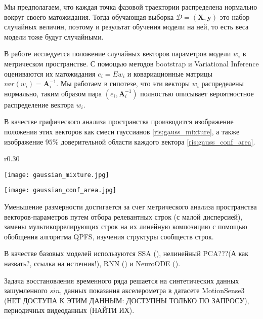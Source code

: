 \documentclass{article}
\begin{document}
Мы предполагаем, что каждая точка фазовой траектории распределена нормально вокруг своего матожидания. Тогда обучающая выборка $\mathcal{D}=(\boldsymbol{X}, \boldsymbol{y})$ это набор случайных величин, поэтому и результат обучения модели на ней, то есть веса модели тоже будут случайными. 

В работе исследуется положение случайных векторов параметров модели $w_i$ в метрическом пространстве. С помощью методов bootstrap и Variational Inference \citep{hastie2009elements} оцениваются их матожидания $e_i=Ew_i$ и ковариационные матрицы $var(w_i) = \boldsymbol{A}^{-1}_i$. Мы работаем в гипотезе, что эти векторы $w_i$ распределены нормально, таким образом пара $(e_i, \boldsymbol{A}^{-1}_i)$ полностью описывает вероятностное распределение вектора $w_i$. 

В качестве графического анализа пространства производится изображение положения этих векторов как смеси гауссианов \ref{ris:gauss_mixture}, а также изображение $95\%$ доверительной области каждого вектора \ref{ris:gauss_conf_area}.

\begin{wrapfigure}{r}{0.30\textwidth}

\texttt{[image: gaussian\_mixture.jpg]}
\caption{Пример смеси гауссианов для 2-х мерных векторов.}
\label{ris:gauss_mixture}

\texttt{[image: gaussian\_conf\_area.jpg]}
\caption{Пример доверительных областей для 3-х мерных векторов.}
\label{ris:gauss_conf_area}

\end{wrapfigure}


Уменьшение размерности достигается за счет метрического анализа пространства векторов-параметров путем отбора релевантных строк (с малой дисперсией), замены мультикоррелирующих строк на их линейную композицию с помощью обобщения алгоритма QPFS, изучения структуры сообществ строк.

В качестве базовых моделей используются SSA (\citep{golyandina2001analysis}), нелинейный PCA???(А как назвать?, ссылка на источник!), RNN (\citep{bronstein2021geometric}) и NeuroODE (\citep{chen2018neural}).

Задача восстановления временного ряда решается на синтетических данных зашумленного $sin$, данных показания акселерометра в датасете MotionSense3 \citep{malekzadeh2018protecting} (НЕТ ДОСТУПА К ЭТИМ ДАННЫМ: ДОСТУПНЫ ТОЛЬКО ПО ЗАПРОСУ), периодичных видеоданных (НАЙТИ ИХ). 


\newpage


\end{document}
